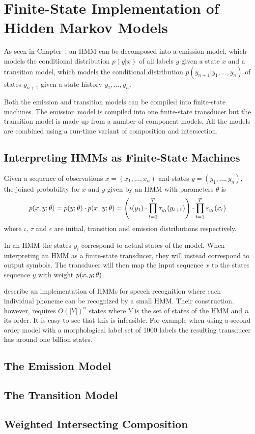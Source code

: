 \section{Finite-State Implementation of Hidden Markov Models}
As seen in Chapter~\cite{chapter:hmm}, an HMM can be decomposed into a
emission model, which models the conditional distribution $p(y|x)$ of
all labels $y$ given a state $x$ and a transition model, which models
the conditional distribution $p(y_{n+1} | y_1, ..., y_n)$ of states
$y_{n+1}$ given a state history $y_1, ..., y_n$.

Both the emission and transition models can be compiled into
finite-state machines. The emission model is compiled into one
finite-state transducer but the transition model is made up from a
number of component models. All the models are combined using a
run-time variant of composition and intersection.

\subsection{Interpreting HMMs as Finite-State Machines}
Given a sequence of observations $x = (x_1, ..., x_n)$ and states $y = (y_1, ..., y_n)$, the joined probability for $x$ and $y$ given by an HMM with parameters $\theta$ is 
$$p(x,y\mbox{$ ; \, $}\theta) = p(y\mbox{$ ; \, $}\theta)\cdot p(x \mbox{$ \, | \, $} y\mbox{$ ; \, $}\theta)= \Bigg(\iota(y_1) \cdot \prod_{t = 1}^{T} \tau_{y_t}(y_{t + 1})\Bigg) \cdot \prod_{t = 1}^T \varepsilon_{y_t}(x_t)$$
where $\iota$, $\tau$ and $\epsilon$ are initial, transition and emission distributions respectively.

In an HMM the states $y_i$ correspond to actual states of the
model. When interpreting an HMM as a finite-state transducer, they
will instead correspond to output symbols. The transducer will then
map the input sequence $x$ to the states sequence $y$ with weight
$p(x,y\mbox{$ ; \, $}\theta)$.

\cite{Mohri2002} describe an implementation of HMMs for speech
recognition where each individual phoneme can be recognized by a small
HMM. Their construction, however, requires $O(|Y|)^n$ states where $Y$
is the set of states of the HMM and $n$ its order. It is easy to see
that this is infeasible. For example when using a second order model
with a morphological label set of 1000 labels the resulting transducer
has around one billion states.

\subsection{The Emission Model}

\subsection{The Transition Model}

\subsection{Weighted Intersecting Composition}